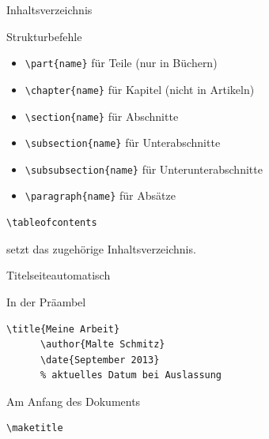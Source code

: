 \begin{Frame}[fragile]{Inhaltsverzeichnis}
  \begin{Block}{Strukturbefehle}
    \begin{itemize}
      \item \lstinline-\part{name}- für Teile (nur in Büchern)
      \item \lstinline-\chapter{name}- für Kapitel (nicht in Artikeln)
      \item \lstinline-\section{name}- für Abschnitte
      \item \lstinline-\subsection{name}- für Unterabschnitte
      \item \lstinline-\subsubsection{name}- für Unterunterabschnitte
      \item \lstinline-\paragraph{name}- für Absätze
    \end{itemize}
  \end{Block}

  \begin{lstlisting}[gobble=4]
    \tableofcontents
  \end{lstlisting}
  setzt das zugehörige Inhaltsverzeichnis.
\end{Frame}

\begin{Frame}[fragile]{Titelseite}{automatisch}
  \begin{Block}{In der Präambel}
    \begin{lstlisting}[gobble=6,style=block]
      \title{Meine Arbeit}
      \author{Malte Schmitz}
      \date{September 2013}
      % aktuelles Datum bei Auslassung
    \end{lstlisting}
  \end{Block}

  \begin{Block}{Am Anfang des Dokuments}
    \begin{lstlisting}[gobble=6,style=block]
      \maketitle
    \end{lstlisting}
  \end{Block}
\end{Frame}


